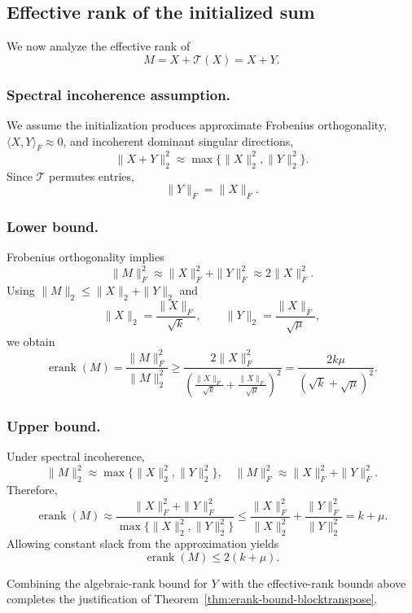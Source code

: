 \documentclass[sigconf,screen]{acmart}
\begin{document}
\subsection{Effective rank of the initialized sum}

We now analyze the effective rank of
\[
M=X+\mathcal T(X)=X+Y.
\]

\subsubsection*{\bf Spectral incoherence assumption.}
We assume the initialization produces approximate Frobenius orthogonality, $\langle X,Y\rangle_F\approx 0$, and incoherent dominant singular directions,
\[
\|X+Y\|_2^2 \approx
\max\{\|X\|_2^2,\|Y\|_2^2\}.
\]
Since $\mathcal T$ permutes entries,
\[
\|Y\|_F=\|X\|_F.
\]

\subsubsection*{\bf Lower bound.}
Frobenius orthogonality implies
\[
\|M\|_F^2
\approx
\|X\|_F^2+\|Y\|_F^2
\approx
2\|X\|_F^2.
\]
Using $\|M\|_2\le\|X\|_2+\|Y\|_2$ and
\[
\|X\|_2=\frac{\|X\|_F}{\sqrt{k}},
\qquad
\|Y\|_2=\frac{\|X\|_F}{\sqrt{\mu}},
\]
we obtain
\[
\operatorname{erank}(M)
=
\frac{\|M\|_F^2}{\|M\|_2^2}
\ge
\frac{2\|X\|_F^2}{
\left(
\frac{\|X\|_F}{\sqrt{k}}
+
\frac{\|X\|_F}{\sqrt{\mu}}
\right)^2}
=
\frac{2k\mu}{(\sqrt{k}+\sqrt{\mu})^2}.
\]

\subsubsection*{\bf Upper bound.}
Under spectral incoherence,
\[
\|M\|_2^2
\approx
\max\{\|X\|_2^2,\|Y\|_2^2\},
\quad
\|M\|_F^2
\approx
\|X\|_F^2+\|Y\|_F^2.
\]
Therefore,
\[
\operatorname{erank}(M)
\approx
\frac{\|X\|_F^2+\|Y\|_F^2}{
\max\{\|X\|_2^2,\|Y\|_2^2\}}
\le
\frac{\|X\|_F^2}{\|X\|_2^2}
+
\frac{\|Y\|_F^2}{\|Y\|_2^2}
=
k+\mu.
\]
Allowing constant slack from the approximation yields
\[
\operatorname{erank}(M)\le 2(k+\mu).
\]

Combining the algebraic-rank bound for $Y$ with the effective-rank bounds above completes the justification of Theorem~\ref{thm:erank-bound-blocktranspose}.





\end{document}
